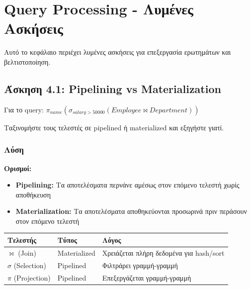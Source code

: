 
\chapter{Query Processing - Λυμένες Ασκήσεις}
\label{ch:query-processing-exercises}

Αυτό το κεφάλαιο περιέχει λυμένες ασκήσεις για επεξεργασία ερωτημάτων και
βελτιστοποίηση.

\section{Άσκηση 4.1: Pipelining vs Materialization}

\begin{formulabox}[Εκφώνηση]
Για το query: $\pi_{name}(\sigma_{salary>50000}(Employee \bowtie Department))$

Ταξινομήστε τους τελεστές σε pipelined ή materialized και εξηγήστε γιατί.
\end{formulabox}

\subsection*{Λύση}

\textbf{Ορισμοί:}
\begin{itemize}
    \item \textbf{Pipelining:} Τα αποτελέσματα περνάνε αμέσως στον επόμενο τελεστή χωρίς αποθήκευση
    \item \textbf{Materialization:} Τα αποτελέσματα αποθηκεύονται προσωρινά πριν περάσουν στον επόμενο τελεστή
\end{itemize}

\begin{center}
\begin{tabular}{lll}
\toprule
\textbf{Τελεστής} & \textbf{Τύπος} & \textbf{Λόγος} \\
\midrule
$\bowtie$ (Join) & Materialized & Χρειάζεται πλήρη δεδομένα για hash/sort \\
$\sigma$ (Selection) & Pipelined & Φιλτράρει γραμμή-γραμμή \\
$\pi$ (Projection) & Pipelined & Επεξεργάζεται γραμμή-γραμμή \\
\bottomrule
\end{tabular}
\end{center}

